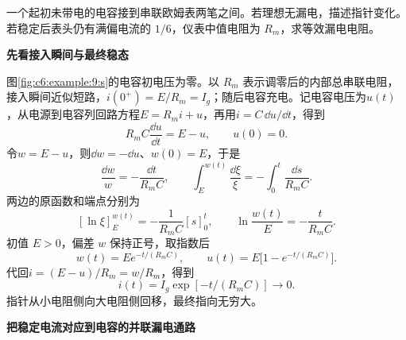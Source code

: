 \begin{question}\begin{example}[用欧姆表观察电容充电与漏电]\label{c6:example:9}
一个起初未带电的电容接到串联欧姆表两笔之间。若理想无漏电，描述指针变化。若稳定后表头仍有满偏电流的 $1/6$，仪表中值电阻为 $R_m$，求等效漏电电阻。
\end{example}
\end{question}
\begin{solution}\textbf{先看接入瞬间与最终稳态}\par\nobreak

图\ref{fig:c6:example:9:s}的电容初电压为零。以 $R_m$ 表示调零后的内部总串联电阻，接入瞬间近似短路，$i(0^+)=E/R_m=I_g$；随后电容充电。记电容电压为$u(t)$，从电源到电容列回路方程$E=R_mi+u$，再用$i=C\,\dd u/\dd t$，得到
\[
R_mC\frac{\dd u}{\dd t}=E-u,\qquad u(0)=0.
\]
令$w=E-u$，则$\dd w=-\dd u$、$w(0)=E$，于是
\[
\frac{\dd w}{w}=-\frac{\dd t}{R_mC},\qquad
\int_E^{w(t)}\frac{\dd \xi}{\xi}
=-\int_0^t\frac{\dd s}{R_mC}.
\]
两边的原函数和端点分别为
\[
 [\ln\xi]_E^{w(t)}=-\frac1{R_mC}[s]_0^t,\qquad
 \ln\frac{w(t)}E=-\frac{t}{R_mC}.
\]
初值 $E>0$，偏差 $w$ 保持正号，取指数后
\[
w(t)=Ee^{-t/(R_mC)},\qquad
u(t)=E\bigl[1-e^{-t/(R_mC)}\bigr].
\]
代回$i=(E-u)/R_m=w/R_m$，得到
\[
i(t)=I_g\exp[-t/(R_mC)]\longrightarrow0.
\]
指针从小电阻侧向大电阻侧回移，最终指向无穷大。


\par\medskip{}\noindent\textbf{把稳定电流对应到电容的并联漏电通路}\par\nobreak



\end{solution}
